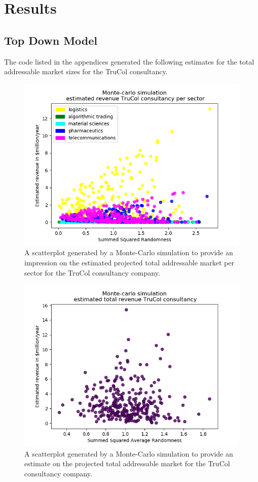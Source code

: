 \section{Results}\label{sec:results}
\subsection{Top Down Model}\label{subsec:results_top_down}
The code listed in the appendices generated the following estimates for the total addressable market sizes for the TruCol consultancy.
\begin{figure}[H]
    \centering
    \includegraphics[width=0.5\linewidth]{Images/revenue_per_sector.png}
    \caption{A scatterplot generated by a Monte-Carlo simulation to provide an impression on the estimated projected total addressable market per sector for the TruCol consultancy company.}
    \label{fig:per_sector}
\end{figure}

\begin{figure}[H]
    \centering
    \includegraphics[width=0.5\linewidth]{Images/revenue_sum.png}
    \caption{A scatterplot generated by a Monte-Carlo simulation to provide an estimate on the projected total addressable market for the TruCol consultancy company.}
    \label{fig:summed}
\end{figure}